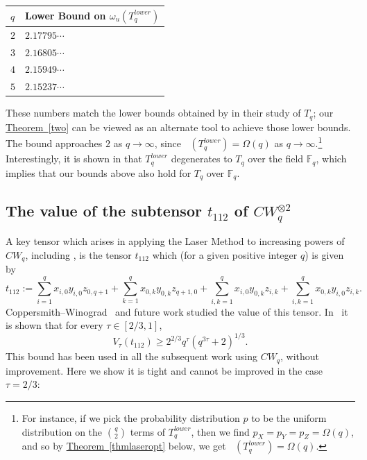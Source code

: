 \documentclass[11pt]{article}
\numberwithin{equation}{section}
\theoremstyle{definition}
\theoremstyle{plain}
\newcommand{\expref}[2]{\hyperref[#2]{#1~\ref{#2}}}
\newcommand{\tsr}{\mathop{\tilde{\operatorname{S}}}}
\newcommand{\F}{\mathbb{F}}
\theoremstyle{definition}
\begin{document}
\begin{center}
\begin{tabular}{l|l}
$q$ & Lower Bound on $\omega_u(T_q^{lower})$ \\ \hline
$2$                                & $2.17795\cdots$                                                        \\
$3$                                & $2.16805\cdots$                                                        \\
$4$                                & $2.15949\cdots$                                                        \\
$5$                                & $2.15237\cdots$                                                     
\end{tabular}
\end{center}

These numbers match the lower bounds obtained by \cite{almanitcs, blasiak} in their study of $T_q$; our \expref{Theorem}{two} can be viewed as an alternate tool to achieve those lower bounds. The bound approaches $2$ as $q \to \infty$, since $\tsr(T_q^{lower}) = \Omega(q)$ as $q \to \infty$.\footnote{For instance, if we pick the probability distribution $p$ to be the uniform distribution on the $\binom{q}{2}$ terms of $T_q^{lower}$, then we find $p_X=p_Y=p_Z = \Omega(q)$, and so by \expref{Theorem}{thmlaseropt} below, we get $\tsr(T_q^{lower}) = \Omega(q)$.}  Interestingly, it is shown in \cite[Theorem~4.16]{quantum} that $T_q^{lower}$ degenerates to $T_q$ over the field $\F_q$, which implies that our bounds above also hold for $T_q$ over $\F_q$.

%
\subsection{The value of the subtensor $t_{112}$ of $CW_q^{\otimes 2}$} \label{t112}

A key tensor which arises in applying the Laser Method to increasing powers of $CW_q$,
%
including \cite{coppersmith, v12,legall,awrefined,legallrect, legallrect2}, 
is the tensor $t_{112}$ which (for a given positive integer $q$) is given by
\[
  t_{112} := \sum_{i=1}^q x_{i,0} y_{i,0} z_{0,q+1} + \sum_{k=1}^q x_{0,k} y_{0,k} z_{q+1,0} + \sum_{i,k=1}^q x_{i,0} y_{0,k} z_{i,k} + \sum_{i,k = 1}^q x_{0,k} y_{i,0} z_{i,k}.
\]
Coppersmith--Winograd~\cite{coppersmith} and future work studied the value of this tensor. In~\cite{coppersmith} it is shown that for every $\tau \in [2/3, 1]$,
\[
  V_\tau(t_{112}) \geq 2^{2/3} q^\tau (q^{3\tau} + 2)^{1/3}.
\]
This bound has been used in all the subsequent work using $CW_q$, without improvement. Here we show it is tight and cannot be improved in the case $\tau=2/3$:
\end{document}
